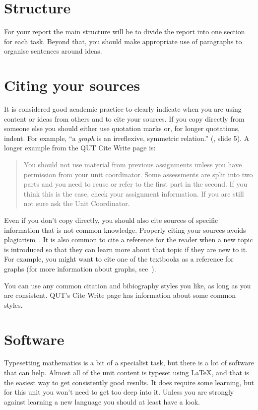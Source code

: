 \documentclass[a4paper]{article}
\begin{document}
\section{Structure}
For your report the main structure will be to divide the report into one section for each task.  Beyond that, you should make appropriate use of paragraphs to organise sentences around ideas.

\section{Citing your sources}
It is considered good academic practice to clearly indicate when you are using content or ideas from others and to cite your sources.  If you copy directly from someone else you should either use quotation marks or, for longer quotations, indent.  For example, ``a \emph{graph} is an irreflexive, symmetric relation.'' (\cite{cab203lecture7}, slide 5).  A longer example from the QUT Cite Write page is: 
\begin{quote}
    You should not use material from previous assignments unless you have permission from your unit coordinator. Some assessments are split into two parts and you need to reuse or refer to the first part in the second. If you think this is the case, check your assignment information. If you are still not sure ask the Unit Coordinator.~\cite{citewrite}
\end{quote}
Even if you don't copy directly, you should also cite sources of specific information that is not common knowledge.  Properly citing your sources avoids plagiarism~\cite{citewrite}.  It is also common to cite a reference for the reader when a new topic is introduced so that they can learn more about that topic if they are new to it.  For example, you might want to cite one of the textbooks as a reference for graphs (for more information about graphs, see~\cite{voloshintextbook}).

You can use any common citation and bibiography styles you like, as long as you are consistent.  QUT's Cite Write page \cite{citewrite} has information about some common styles.

\section{Software}
Typesetting mathematics is a bit of a specialist task, but there is a lot of software that can help.  Almost all of the unit content is typeset using \LaTeX, and that is the easiest way to get consistently good results.  It does require some learning, but for this unit you won't need to get too deep into it.  Unless you are strongly against learning a new language you should at least have a look.
\end{document}
